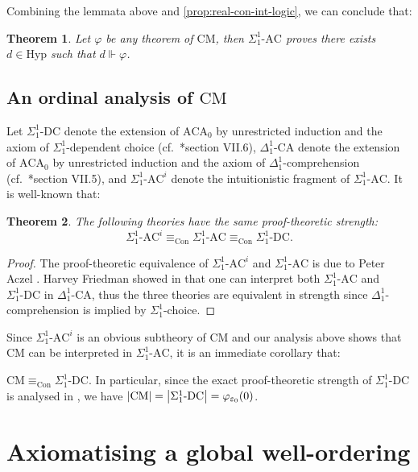 \documentclass[12pt,openany]{book}
\theoremstyle{plain}
\newtheorem{theorem}{Theorem}[section]
\theoremstyle{definition}
\DeclareMathOperator\Con{Con}
\newcommand\ACA{\mathrm{ACA}}
\newcommand\AC{\text{-}\mathrm{AC}}
\newcommand\DC{\text{-}\mathrm{DC}}
\newcommand\CA{\text{-}\mathrm{CA}}
\newcommand\CM{\mathrm{CM}}
\newcommand\Hyp{\mathrm{Hyp}}
\begin{document}
Combining the lemmata above and \autoref{prop:real-con-int-logic}, we can conclude that:
\begin{theorem}
  Let $\varphi$ be any theorem of $\CM$, then $\Sigma^1_1\AC$ proves there exists $d \in \Hyp$ such that $d \Vdash \varphi$.
\end{theorem}

\subsection*{An ordinal analysis of $\CM$}

Let $\Sigma^1_1\DC$ denote the extension of $\ACA_0$ by unrestricted induction and the axiom of $\Sigma^1_1$-dependent choice (cf.\ \cite{simpson09-soa}*{section VII.6}), $\Delta^1_1\CA$ denote the extension of $\ACA_0$ by unrestricted induction and the axiom of $\Delta^1_1$-comprehension (cf.\ \cite{simpson09-soa}*{section VII.5}), and $\Sigma^1_1\AC^i$ denote the intuitionistic fragment of $\Sigma^1_1\AC$. It is well-known that:
\begin{theorem}
  The following theories have the same proof-theoretic strength:
  \[\Sigma^1_1\AC^i \equiv_{\Con} \Sigma^1_1\AC \equiv_{\Con} \Sigma^1_1\DC.\]
\end{theorem}

\begin{proof}
  The proof-theoretic equivalence of $\Sigma^1_1\AC^i$ and $\Sigma^1_1\AC$ is due to Peter Aczel \cite{aczel77-martin-lof}. Harvey Friedman showed in \cite{friedman67-thesis} that one can interpret both $\Sigma^1_1\AC$ and $\Sigma^1_1\DC$ in $\Delta^1_1\CA$, thus the three theories are equivalent in strength since $\Delta^1_1$-comprehension is implied by $\Sigma^1_1$-choice.
\end{proof}

Since $\Sigma^1_1\AC^i$ is an obvious subtheory of $\CM$ and our analysis above shows that $\CM$ can be interpreted in $\Sigma^1_1\AC$, it is an immediate corollary that:
\begin{corollary}
  \label{cor:cm-oa}
  $\CM \equiv_{\Con} \Sigma^1_1\DC$. In particular, since the exact proof-theoretic strength of $\Sigma^1_1\DC$ is analysed in \cite{friedman70-sigma11-12-ac}, we have $\left|\CM\right| = \left|\Sigma^1_1\DC\right| = \varphi_{\varepsilon_0}\mleft(0\mright)$.
\end{corollary}

\section{Axiomatising a global well-ordering}
\label{sec:cm-gwo-axioms}
\end{document}
